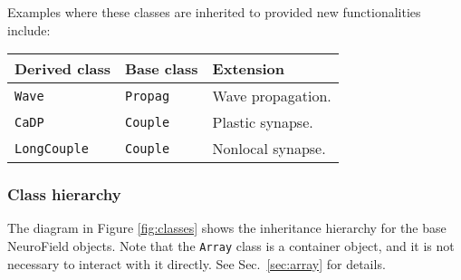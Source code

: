 \documentclass[12pt,a4paper]{article}
\newcommand{\type}[1]{ {\small\small\tt #1} }
\begin{document}
Examples where these classes are inherited to provided new functionalities include:

\begin{tabular}{l l l}
	Derived class&Base class&Extension\\
	\hline
	\type{Wave}&\type{Propag}&Wave propagation.\\
	\type{CaDP}&\type{Couple}&Plastic synapse.\\
	\type{LongCouple}&\type{Couple}&Nonlocal synapse.
\end{tabular}

\subsubsection{Class hierarchy}
The diagram in Figure \ref{fig:classes} shows the inheritance hierarchy for the base NeuroField objects. Note that the \type{Array} class is a container object, and it is not necessary to interact with it directly. See Sec.~\ref{sec:array} for details.
\end{document}
